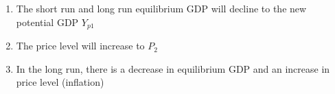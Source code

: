\documentclass[12pt]{article}
\begin{document}
\begin{enumerate}
\begin{enumerate}
\begin{enumerate}
              \item The short run and long run equilibrium GDP will decline to the new potential GDP $Y_{p1}$

              \item The price level will increase to $P_2$

              \item In the long run, there is a decrease in equilibrium GDP and an increase in price level (inflation)

            \end{enumerate}

        \end{enumerate}

    \end{enumerate}
\end{document}
